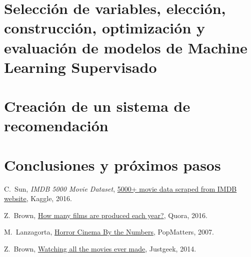 \documentclass{article}
\begin{document}
\clearpage

\section{Selección de variables, elección, construcción, optimización y evaluación de modelos de Machine Learning Supervisado}
\blindtext

\clearpage

\section{Creación de un sistema de recomendación}

\blindtext

\clearpage

\section{Conclusiones y próximos pasos}

\blindtext

\clearpage

\begin{thebibliography}{1}


C.~Sun, \emph{IMDB 5000 Movie Dataset}, \href{https://www.kaggle.com/deepmatrix/imdb-5000-movie-dataset}{5000+ movie data scraped from IMDB website}, \relax Kaggle, 2016.

Z.~Brown, \href{https://www.quora.com/How-many-films-are-produced-each-year}{How many films are produced each year?}, \relax Quora, 2016.

M.~Lanzagorta, \href{http://www.popmatters.com/column/horror-cinema-by-the-numbers/}{Horror Cinema By the Numbers}, \relax PopMatters, 2007.

Z.~Brown, \href{http://www.justgeek.de/watching-all-the-movies-ever-made/}{Watching all the movies ever made}, \relax Justgeek, 2014.

\end{thebibliography}

%
\end{document}
